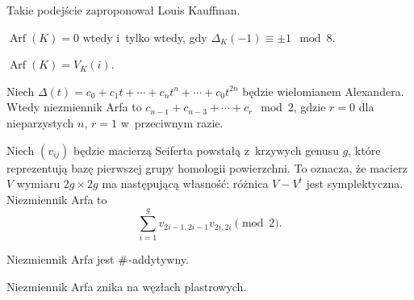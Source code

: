 Takie podejście zaproponował Louis Kauffman.

\begin{proposition}[Murasugi]
	$\operatorname{Arf}(K) = 0$ wtedy i~tylko wtedy, gdy $\Delta_K(-1) \equiv \pm 1 \mod 8$.
\end{proposition}

\begin{proposition}[Jones, 1985]
	$\operatorname{Arf}(K) = V_K(i)$.
\end{proposition}

\begin{proposition}[Robertello]
	Niech $ \Delta (t)=c_{0}+c_{1}t+\cdots +c_{n}t^{n}+\cdots +c_{0}t^{2n}$ będzie wielomianem Alexandera.
	Wtedy niezmiennik Arfa to $ c_{n-1}+c_{n-3}+\cdots +c_{r}\mod 2$, gdzie $r = 0$ dla nieparzystych $n$, $r = 1$ w~przeciwnym razie.
\end{proposition}

\begin{proposition}
	Niech $(v_{ij})$ będzie macierzą Seiferta powstałą z~krzywych genusu $g$, które reprezentują bazę pierwszej grupy homologii powierzchni.
	To oznacza, że macierz $V$ wymiaru $2g \times 2g$ ma następującą własność: różnica $V - V^t$ jest symplektyczna.
	Niezmiennik Arfa to
	\begin{equation}
		\sum^g_{i=1}v_{2i-1,2i-1}v_{2i,2i} \pmod 2.
	\end{equation}
\end{proposition}

\begin{proposition}
	Niezmiennik Arfa jest $\mathbin{\#}$-addytywny.
\end{proposition}

\begin{proposition}
	Niezmiennik Arfa znika na węzłach plastrowych.
\end{proposition}


